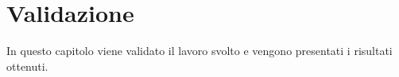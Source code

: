 \chapter{Validazione}
In questo capitolo viene validato il lavoro svolto e vengono presentati i risultati ottenuti.